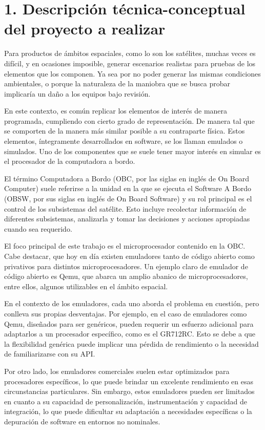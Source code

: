 \section{1. Descripción técnica-conceptual del proyecto a realizar}
\label{sec:descripcion}

Para productos de ámbitos espaciales, como lo son los satélites, muchas veces es difícil, y en ocasiones imposible, generar escenarios realistas para pruebas de los elementos que los componen. Ya sea por no poder generar las mismas condiciones ambientales, o porque la naturaleza de la maniobra que se busca probar implicaría un daño a los equipos bajo revisión.

En este contexto, es común replicar los elementos de interés de manera programada, cumpliendo con cierto grado de representación. De manera tal que se comporten de la manera más similar posible a su contraparte física. Estos elementos, íntegramente desarrollados en software, se los llaman emulados o simulados. Uno de los componentes que se suele tener mayor interés en simular es el procesador de la computadora a bordo.

El término Computadora a Bordo (OBC, por las siglas en inglés de On Board Computer) suele referirse a la unidad en la que se ejecuta el Software A Bordo (OBSW, por sus siglas en inglés de On Board Software) y su rol principal es el control de los subsistemas del satélite. Esto incluye recolectar información de diferentes subsistemas, analizarla y tomar las decisiones y acciones apropiadas cuando sea requerido.

El foco principal de este trabajo es el microprocesador contenido en la OBC. Cabe destacar, que hoy en día existen emuladores tanto de código abierto como privativos para distintos microprocesadores. Un ejemplo claro de emulador de código abierto es Qemu, que abarca un amplio abanico de microprocesadores, entre ellos, algunos utilizables en el ámbito espacial.

En el contexto de los emuladores, cada uno aborda el problema en cuestión, pero conlleva sus propias desventajas. Por ejemplo, en el caso de emuladores como Qemu, diseñados para ser genéricos, pueden requerir un esfuerzo adicional para adaptarlos a un procesador específico, como es el GR712RC. Esto se debe a que la flexibilidad genérica puede implicar una pérdida de rendimiento o la necesidad de familiarizarse con su API.

Por otro lado, los emuladores comerciales suelen estar optimizados para procesadores específicos, lo que puede brindar un excelente rendimiento en esas circunstancias particulares. Sin embargo, estos emuladores pueden ser limitados en cuanto a su capacidad de personalización, instrumentación y capacidad de integración, lo que puede dificultar su adaptación a necesidades específicas o la depuración de software en entornos no nominales.

